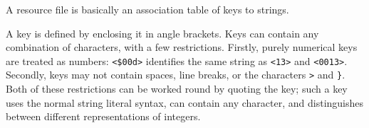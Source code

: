 
    A resource file is basically an association table of keys to strings.

    A key is defined by enclosing it in angle brackets.  Keys can contain any
    combination of characters, with a few restrictions.  Firstly, purely
    numerical keys are treated as numbers: \lstinline|<$00d>| identifies the
    same string as \lstinline|<13>| and \lstinline|<0013>|.  Secondly, keys may
    not contain spaces, line breaks, or the characters \lstinline|>| and
    \lstinline|}|.  Both of these restrictions can be worked round by quoting
    the key; such a key uses the normal string literal syntax, can contain any
    character, and distinguishes between different representations of integers.

